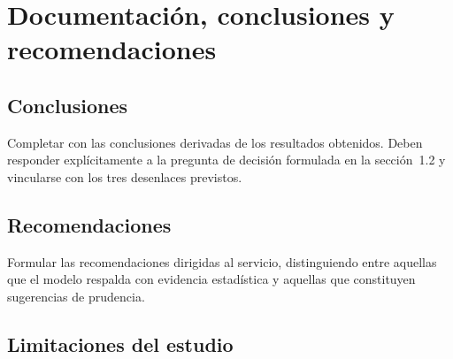 \section{Documentación, conclusiones y recomendaciones}

\subsection{Conclusiones}

\begin{pendiente}
Completar con las conclusiones derivadas de los resultados obtenidos. Deben
responder explícitamente a la pregunta de decisión formulada en la
sección~1.2 y vincularse con los tres desenlaces previstos.
\end{pendiente}

\subsection{Recomendaciones}

\begin{pendiente}
Formular las recomendaciones dirigidas al servicio, distinguiendo entre
aquellas que el modelo respalda con evidencia estadística y aquellas que
constituyen sugerencias de prudencia.
\end{pendiente}

\subsection{Limitaciones del estudio}

